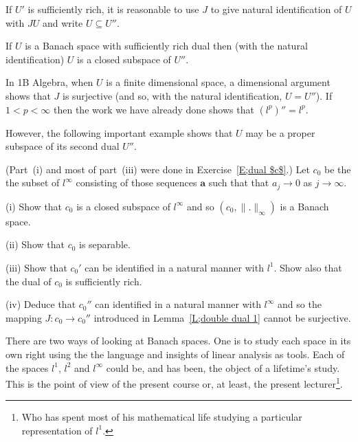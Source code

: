 If $U'$ is sufficiently rich,
it is reasonable to use $J$ to give natural identification
of $U$ with $JU$ and write $U\subseteq U''$.
\begin{lemma} If $U$ is a Banach space with sufficiently rich dual
then (with the natural identification) $U$ is a closed
subspace of $U''$.
\end{lemma}

In 1B Algebra, when $U$ is a finite dimensional space,
a dimensional argument shows that $J$ is surjective
(and so, with the natural identification, $U=U''$).
If $1<p<\infty$ then the work we have already done shows 
that $(l^{p})''=l^{p}$.

However, the following important example shows that
$U$ may be a proper subspace of its second dual $U''$.
\begin{exercise} (Part~(i) and most of part~(iii) 
were done in  Exercise~\ref{E;dual $c$}.)
Let $c_{0}$ be the the subset of $l^{\infty}$
consisting of those sequences ${\mathbf a}$ such that
that $a_{j}\rightarrow 0$ as $j\rightarrow\infty$.

(i) Show that $c_{0}$ is a closed subspace of $l^{\infty}$
and so $(c_{0},\|.\|_{\infty})$ is a Banach space.

(ii) Show that $c_{0}$ is separable.

(iii) Show that $c_{0}'$ can be identified in a natural manner
with $l^{1}$. Show also that the dual of $c_{0}$ is sufficiently rich.

(iv) Deduce that $c_{0}''$ can identified in a natural manner with 
$l^{\infty}$ and so the mapping $J:c_{0}\rightarrow c_{0}''$ introduced
in Lemma~\ref{L;double dual 1} cannot be surjective.
\end{exercise}

There are two ways of looking at Banach spaces. One is to study
each space in its own right using the the language and insights
of linear analysis as tools. Each of the spaces $l^{1}$,
$l^{2}$ and $l^{\infty}$ could be, and has been, the
object of a lifetime's study. This is the point of view
of the present course or, at least, the present 
lecturer\footnote{Who has spent most of his mathematical life studying
a particular representation of $l^{1}$.}.

